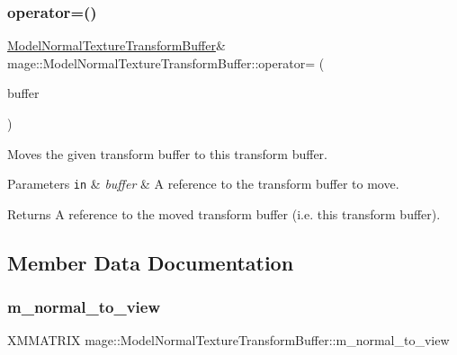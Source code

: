 \subsubsection{\texorpdfstring{operator=()}{operator=()}\hspace{0.1cm}{\footnotesize\ttfamily [2/2]}}
{\footnotesize\ttfamily \hyperlink{structmage_1_1_model_normal_texture_transform_buffer}{Model\+Normal\+Texture\+Transform\+Buffer}\& mage\+::\+Model\+Normal\+Texture\+Transform\+Buffer\+::operator= (\begin{DoxyParamCaption}\item[{\hyperlink{structmage_1_1_model_normal_texture_transform_buffer}{Model\+Normal\+Texture\+Transform\+Buffer} \&\&}]{buffer }\end{DoxyParamCaption})\hspace{0.3cm}{\ttfamily [default]}}

Moves the given transform buffer to this transform buffer.


\begin{DoxyParams}[1]{Parameters}
\mbox{\tt in}  & {\em buffer} & A reference to the transform buffer to move. \\
\hline
\end{DoxyParams}
\begin{DoxyReturn}{Returns}
A reference to the moved transform buffer (i.\+e. this transform buffer). 
\end{DoxyReturn}


\subsection{Member Data Documentation}
\hypertarget{structmage_1_1_model_normal_texture_transform_buffer_a2e8950b98f36bd1ad6d5b35a8db298a9}{}\label{structmage_1_1_model_normal_texture_transform_buffer_a2e8950b98f36bd1ad6d5b35a8db298a9} 
\subsubsection{\texorpdfstring{m\+\_\+normal\+\_\+to\+\_\+view}{m\_normal\_to\_view}}
{\footnotesize\ttfamily X\+M\+M\+A\+T\+R\+IX mage\+::\+Model\+Normal\+Texture\+Transform\+Buffer\+::m\+\_\+normal\+\_\+to\+\_\+view}

